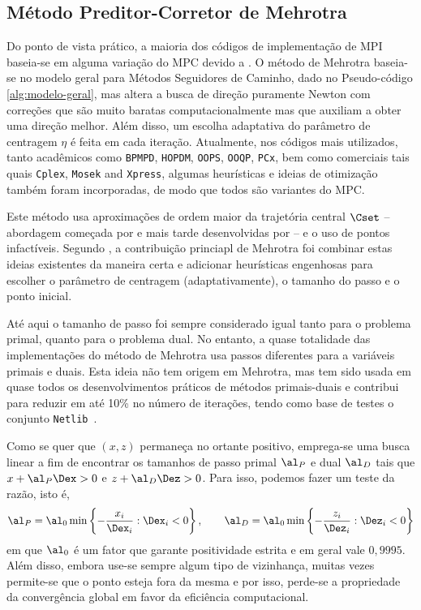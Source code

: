 \subsection{Método Preditor-Corretor de Mehrotra}
Do ponto de vista prático, a maioria dos códigos de implementação de \ac{MPI}
baseia-se em alguma variação do 
\ac{MPC} devido a \citet{Mehrotra:1992wr}. O método de Mehrotra baseia-se no modelo geral
para Métodos Seguidores de Caminho, dado no Pseudo-código
\ref{alg:modelo-geral}, mas altera a busca de direção puramente Newton com
correções que são muito baratas computacionalmente mas que auxiliam a obter uma
direção melhor. Além disso, um escolha adaptativa do parâmetro de centragem
$\eta$ é feita em cada iteração. Atualmente, nos códigos mais utilizados, tanto
acadêmicos como \texttt{BPMPD}, \texttt{HOPDM}, \texttt{OOPS}, \texttt{OOQP},
\texttt{PCx}, bem como  comerciais tais quais \texttt{Cplex}, \texttt{Mosek} and
\texttt{Xpress}, algumas heurísticas e ideias de otimização também foram
incorporadas, de modo que todos são variantes do \ac{MPC}.

Este método usa  aproximações de ordem maior da trajetória central $\Cset$ --
abordagem começada  por \citet{Meggido:Pathways-to-the-optimal:1988u} e mais
tarde desenvolvidas por
\citet{Monteiro:1990vn} -- e o uso de pontos infactíveis. Segundo \citet[pg
194]{Wright:Primal-dual-interior-point:1997h},  a contribuição princiapl
de Mehrotra foi combinar estas ideias existentes da maneira certa e adicionar
heurísticas engenhosas para escolher o parâmetro de centragem (adaptativamente), o tamanho
do passo e o ponto inicial.

Até aqui o tamanho de passo foi sempre considerado igual tanto para o problema
primal, quanto para o problema dual. No entanto, a quase totalidade das
implementações do método de Mehrotra usa passos diferentes para a variáveis
primais e duais. Esta ideia não tem origem em Mehrotra, mas tem sido usada em
quase todos os desenvolvimentos práticos de métodos primais-duais e  contribui
para reduzir em até 10\% no número de iterações, tendo como base de testes o
conjunto  \texttt{Netlib}~\cite[pg.
195]{Wright:Primal-dual-interior-point:1997h}.

Como se quer que $(x,z)$ permaneça no ortante positivo, emprega-se uma busca
linear a fim de encontrar os tamanhos de passo primal $\al_P$ e dual $\al_D$  tais que
$x+\al_P\Dex >0$ e $z+\al_D\Dez >0$. Para isso, podemos fazer um teste da
razão, isto é,
\begin{equation}
\label{eq:size-step}
\al_P = \al_0\min \left\{- \frac{x_i}{\Dex_i} : \Dex_i <
0\right\}, \qquad \al_D = \al_0\min \left\{- \frac{z_i}{\Dez_i} : \Dez_i <
0\right\}
\end{equation} 
em que $\al_0$ é um fator que garante positividade estrita e em geral vale
$0,9995$. Além disso, embora use-se sempre  algum tipo de vizinhança, muitas
vezes permite-se que o ponto esteja fora da mesma e por isso, perde-se a
propriedade da convergência global em favor da eficiência computacional. 


